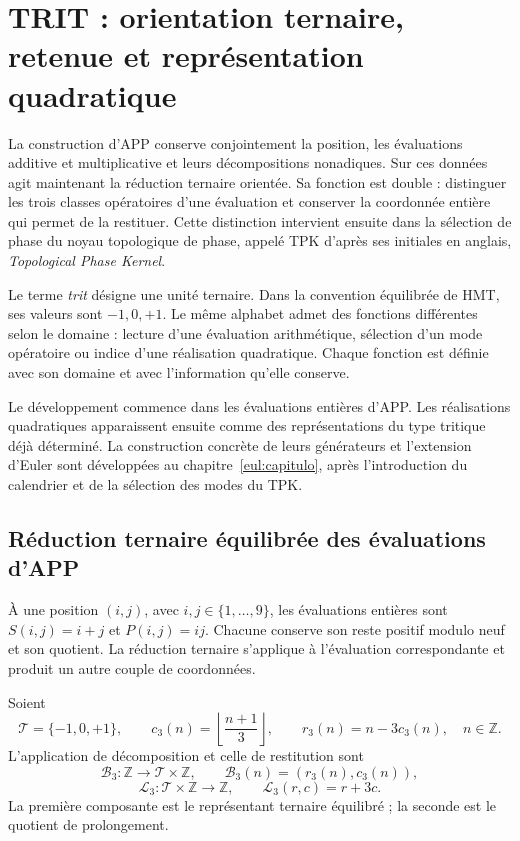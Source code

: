 \section{TRIT : orientation ternaire, retenue et représentation quadratique}
\label{trit:capitulo}

La construction d'APP conserve conjointement la position, les évaluations
additive et multiplicative et leurs décompositions nonadiques. Sur ces données
agit maintenant la réduction ternaire orientée. Sa fonction est double : distinguer
les trois classes opératoires d'une évaluation et conserver la coordonnée entière
qui permet de la restituer. Cette distinction intervient ensuite dans la sélection
de phase du noyau topologique de phase, appelé TPK d'après ses initiales en
anglais, \emph{Topological Phase Kernel}.

Le terme \emph{trit} désigne une unité ternaire. Dans la convention équilibrée
de HMT, ses valeurs sont \(-1,0,+1\). Le même alphabet admet des fonctions
différentes selon le domaine : lecture d'une évaluation arithmétique, sélection
d'un mode opératoire ou indice d'une réalisation quadratique. Chaque fonction
est définie avec son domaine et avec l'information qu'elle conserve.

Le développement commence dans les évaluations entières d'APP. Les réalisations
quadratiques apparaissent ensuite comme des représentations du type tritique déjà
déterminé. La construction concrète de leurs générateurs et l'extension
d'Euler sont développées au chapitre~\ref{eul:capitulo}, après l'introduction
du calendrier et de la sélection des modes du TPK.

\subsection{Réduction ternaire équilibrée des évaluations d'APP}
\label{trit:reduccion}

À une position \((i,j)\), avec \(i,j\in\{1,\ldots,9\}\), les évaluations
entières sont \(S(i,j)=i+j\) et \(P(i,j)=ij\). Chacune conserve son reste
positif modulo neuf et son quotient. La réduction ternaire s'applique à
l'évaluation correspondante et produit un autre couple de coordonnées.

\begin{definicion}
\label{trit:def:balanceada}
Soient
\[
 \mathcal T=\{-1,0,+1\},\qquad
 c_3(n)=\left\lfloor\frac{n+1}{3}\right\rfloor,\qquad
 r_3(n)=n-3c_3(n),\quad n\in\mathbb Z.
\]
L'application de décomposition et celle de restitution sont
\[
 \mathcal B_3:\mathbb Z\longrightarrow\mathcal T\times\mathbb Z,
 \qquad \mathcal B_3(n)=(r_3(n),c_3(n)),
\]
\[
 \mathcal L_3:\mathcal T\times\mathbb Z\longrightarrow\mathbb Z,
 \qquad \mathcal L_3(r,c)=r+3c.
\]
La première composante est le représentant ternaire équilibré ; la seconde
est le quotient de prolongement.
\end{definicion}

